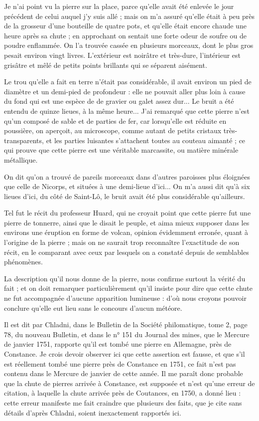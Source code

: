 \documentclass[a4paper, 12pt, oneside, french]{article}
\begin{document}
\og Je n'ai point vu la pierre sur la place, parce qu'elle avait été enlevée le jour précédent de celui auquel j'y suis allé ; mais on m'a assuré qu'elle était à peu près de la grosseur d'une bouteille de quatre pots, et qu'elle était encore chaude une heure après sa chute ; en approchant on sentait une forte odeur de soufre ou de poudre enflammée. On l'a trouvée cassée en plusieurs morceaux, dont le plus gros pesait environ vingt livres. L'extérieur est noirâtre et très-dure, l'intérieur est grisâtre et mêlé de petits points brillants qui se séparent aisément. \fg

\og Le trou qu'elle a fait en terre n'était pas considérable, il avait environ un pied de diamètre et un demi-pied de profondeur : elle ne pouvait aller plus loin à cause du fond qui est une espèce de de gravier ou galet assez dur... Le bruit a été entendu de quinze lieues, à la même heure... J'ai remarqué que cette pierre n'est qu'un composé de sable et de parties de fer, car lorsqu'elle est réduite en poussière, on aperçoit, au microscope, comme autant de petits cristaux très-transparents, et les parties luisantes s'attachent toutes au couteau aimanté ; ce qui prouve que cette pierre est une véritable marcassite, ou matière minérale métallique. \fg

\og On dit qu'on a trouvé de pareils morceaux dans d'autres paroisses plus éloignées que celle de Nicorps, et situées à une demi-lieue d'ici... On m'a aussi dit qu'à six lieues d'ici, du côté de Saint-Lô, le bruit avait été plus considérable qu'ailleurs. \fg

Tel fut le récit du professeur Huard, qui ne croyait point que cette pierre fut une pierre de tonnerre, ainsi que le disait le peuple, et aima mieux supposer dans les environs une éruption en forme de volcan, opinion évidemment erronée, quant à l'origine de la pierre ; mais on ne saurait trop reconnaître l'exactitude de son récit, en le comparant avec ceux par lesquels on a constaté depuis de semblables phénomènes.

La description qu'il nous donne de la pierre, nous confirme surtout la vérité du fait ; et on doit remarquer particulièrement qu'il insiste pour dire que cette chute ne fut accompagnée d'aucune apparition lumineuse : d'où nous croyons pouvoir conclure qu'elle eut lieu sans le concours d'aucun météore.

Il est dit par Chladni, dans le Bulletin de la Société philomatique, tome 2, page 78, du nouveau Bulletin, et dans le n° 151 du Journal des mines, que le Mercure de janvier 1751, rapporte qu'il est tombé une pierre en Allemagne, près de Constance. Je crois devoir observer ici que cette assertion est fausse, et que s'il est réellement tombé une pierre près de Constance en 1751, ce fait n'est pas contenu dans le Mercure de janvier de cette année. Il me paraît donc probable que la chute de pierres arrivée à Constance, est supposée et n'est qu'une erreur de citation, à laquelle la chute arrivée près de Coutances, en 1750, a donné lieu : cette erreur manifeste me fait craindre que plusieurs des faits, que je cite sans détails d'après Chladni, soient inexactement rapportés ici.
\end{document}
